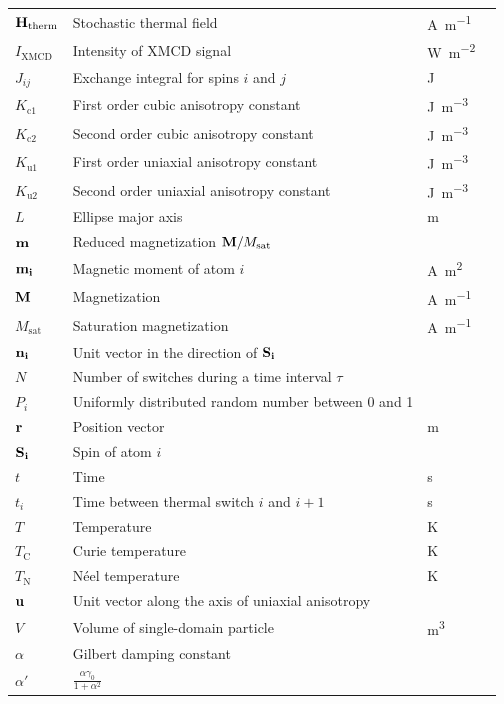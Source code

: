 \documentclass[11pt,a4paper,english]{article}
\begin{document}
\begin{longtable}{llll}
$\vb{H_\mathrm{therm}}$ & Stochastic thermal field & \si{\ampere\per\metre} \\
$I_\mathrm{XMCD}$ & Intensity of XMCD signal & \si{\watt\per\metre\squared} \\
$J_{ij}$ & Exchange integral for spins $i$ and $j$ & \si{\joule} \\
$K_\mathrm{c1}$ & First order cubic anisotropy constant & \si{\joule\per\metre\cubed} \\
$K_\mathrm{c2}$ & Second order cubic anisotropy constant & \si{\joule\per\metre\cubed} \\
$K_\mathrm{u1}$ & First order uniaxial anisotropy constant & \si{\joule\per\metre\cubed} \\
$K_\mathrm{u2}$ & Second order uniaxial anisotropy constant & \si{\joule\per\metre\cubed} \\
$L$ & Ellipse major axis & \si{\metre} \\
$\vb{m}$ & Reduced magnetization $\vb{M}/M_\mathrm{sat}$ &  \\
$\vb{m_i}$ & Magnetic moment of atom $i$ & \si{\ampere\metre\squared} \\
$\vb{M}$ & Magnetization & \si{\ampere\per\metre} \\
$M_\mathrm{sat}$ & Saturation magnetization & \si{\ampere\per\metre} \\
$\vb{n_i}$ & Unit vector in the direction of $\vb{S_i}$ &  \\
$N$ & Number of switches during a time interval $\tau$ &  \\
$P_i$ & Uniformly distributed random number between 0 and 1 &  \\
$\vb{r}$ & Position vector & \si{\metre} \\
$\vb{S_i}$ & Spin of atom $i$ &  \\
$t$ & Time & \si{\second} \\
$t_i$ & Time between thermal switch $i$ and $i+1$ & \si{\second} \\
$T$ & Temperature & \si{\kelvin} \\
$T_\mathrm{C}$ & Curie temperature & \si{\kelvin} \\
$T_\mathrm{N}$ & N\'{e}el temperature & \si{\kelvin} \\
$\vb{u}$ & Unit vector along the axis of uniaxial anisotropy &  \\
$V$ & Volume of single-domain particle & \si{\metre\cubed} \\
\midrule
$\alpha$ & Gilbert damping constant &  \\
$\alpha'$ & $\frac{\alpha \gamma_0}{1+\alpha^2}$ &  \\

\end{longtable}
\end{document}
